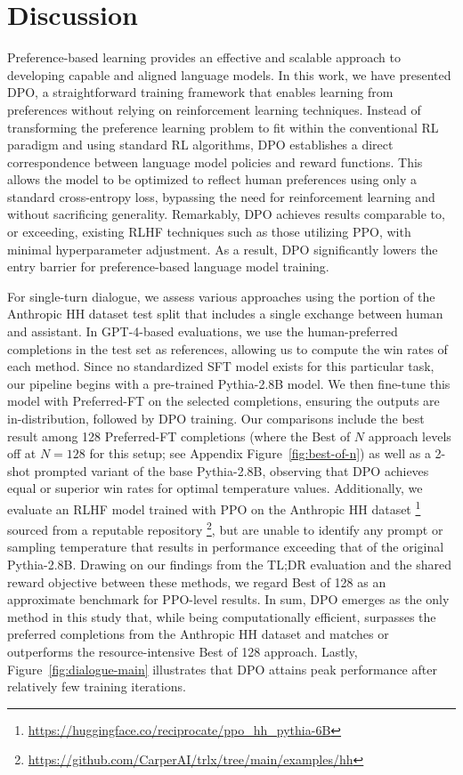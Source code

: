 \section{Discussion}
Preference-based learning provides an effective and scalable approach to developing capable and aligned language models. In this work, we have presented DPO, a straightforward training framework that enables learning from preferences without relying on reinforcement learning techniques. Instead of transforming the preference learning problem to fit within the conventional RL paradigm and using standard RL algorithms, DPO establishes a direct correspondence between language model policies and reward functions. This allows the model to be optimized to reflect human preferences using only a standard cross-entropy loss, bypassing the need for reinforcement learning and without sacrificing generality. Remarkably, DPO achieves results comparable to, or exceeding, existing RLHF techniques such as those utilizing PPO, with minimal hyperparameter adjustment. As a result, DPO significantly lowers the entry barrier for preference-based language model training.

For single-turn dialogue, we assess various approaches using the portion of the Anthropic HH dataset \citep{bai2022training} test split that includes a single exchange between human and assistant. In GPT-4-based evaluations, we use the human-preferred completions in the test set as references, allowing us to compute the win rates of each method. Since no standardized SFT model exists for this particular task, our pipeline begins with a pre-trained Pythia-2.8B model. We then fine-tune this model with Preferred-FT on the selected completions, ensuring the outputs are in-distribution, followed by DPO training. Our comparisons include the best result among 128 Preferred-FT completions (where the Best of $N$ approach levels off at $N=128$ for this setup; see Appendix Figure~\ref{fig:best-of-n}) as well as a 2-shot prompted variant of the base Pythia-2.8B, observing that DPO achieves equal or superior win rates for optimal temperature values. Additionally, we evaluate an RLHF model trained with PPO on the Anthropic HH dataset \footnote{\url{https://huggingface.co/reciprocate/ppo_hh_pythia-6B}} sourced from a reputable repository \footnote{\url{https://github.com/CarperAI/trlx/tree/main/examples/hh}}, but are unable to identify any prompt or sampling temperature that results in performance exceeding that of the original Pythia-2.8B. Drawing on our findings from the TL;DR evaluation and the shared reward objective between these methods, we regard Best of 128 as an approximate benchmark for PPO-level results. In sum, DPO emerges as the only method in this study that, while being computationally efficient, surpasses the preferred completions from the Anthropic HH dataset and matches or outperforms the resource-intensive Best of 128 approach. Lastly, Figure~\ref{fig:dialogue-main} illustrates that DPO attains peak performance after relatively few training iterations.

